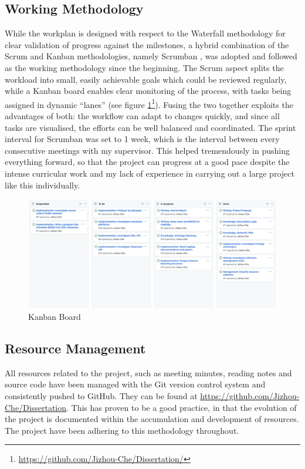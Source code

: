 \subsection{Working Methodology}
While the workplan is designed with respect to the Waterfall methodology \cite{balaji2012waterfall} for clear validation of progress against the milestones, a hybrid combination of the Scrum and Kanban methodologies, namely Scrumban \cite{DBLP:conf/ispw/NikitinaKS12}, was adopted and followed as the working methodology since the beginning. The Scrum aspect splits the workload into small, easily achievable goals which could be reviewed regularly, while a Kanban board enables clear monitoring of the process, with tasks being assigned in dynamic ``lanes'' (see figure \ref{fig:Kanban}\footnote{\url{https://github.com/Jizhou-Che/Dissertation/}}). Fusing the two together exploits the advantages of both: the workflow can adapt to changes quickly, and since all tasks are visualised, the efforts can be well balanced and coordinated. The sprint interval for Scrumban was set to 1 week, which is the interval between every consecutive meetings with my supervisor. This helped tremendously in pushing everything forward, so that the project can progress at a good pace despite the intense curricular work and my lack of experience in carrying out a large project like this individually.

\begin{figure}[ht]
\includegraphics[width=\textwidth]{img/Kanban.png}
\caption{Kanban Board}
\label{fig:Kanban}
\end{figure}

\subsection{Resource Management}
All resources related to the project, such as meeting minutes, reading notes and source code have been managed with the Git version control system and consistently pushed to GitHub. They can be found at \url{https://github.com/Jizhou-Che/Dissertation}. This has proven to be a good practice, in that the evolution of the project is documented within the accumulation and development of resources. The project have been adhering to this methodology throughout.

